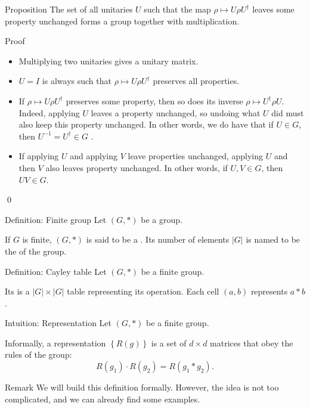 \documentclass[a4paper]{article}
\begin{document}
\begin{parag}{Proposition}
    The set of all unitaries $U$ such that the map $\rho \mapsto U \rho U^{\dagger}$ leaves some property unchanged forms a group together with multiplication.

    \begin{subparag}{Proof}
        \begin{itemize}[left=0pt]
            \item Multiplying two unitaries gives a unitary matrix.
            \item $U = I$ is always such that $\rho \mapsto U \rho U^{\dagger}$ preserves all properties.
            \item If $\rho \mapsto U \rho U^{\dagger}$ preserves some property, then so does its inverse $\rho \mapsto U^{\dagger} \rho U$. Indeed, applying $U$ leaves a property unchanged, so undoing what $U$ did must also keep this property unchanged. In other words, we do have that if $U \in G$, then $U^{-1} = U^{\dagger} \in G$  .
            \item If applying $U$ and applying $V$ leave properties unchanged, applying $U$ and then $V$ also leaves property unchanged. In other words, if $U, V \in G$, then $UV \in G$.
        \end{itemize}

        \qed
    \end{subparag}
\end{parag}

\begin{parag}{Definition: Finite group}
    Let $\left(G, *\right)$ be a group.

    If $G$ is finite, $\left(G, *\right)$ is said to be a . Its number of elements $\left|G\right|$ is named to be the  of the group.
\end{parag}

\begin{parag}{Definition: Cayley table}
    Let $\left(G, *\right)$ be a finite group.

    Its  is a $\left|G\right| \times \left|G\right|$ table representing its operation. Each cell $\left(a, b\right)$ represents $a * b$.
\end{parag}

\begin{parag}{Intuition: Representation}
    Let $\left(G, *\right)$ be a finite group.

    Informally, a representation $\left\{R\left(g\right)\right\}$ is a set of $d\times d$ matrices that obey the rules of the group: 
    \[R\left(g_1\right)\cdot R\left(g_2\right) = R\left(g_1 * g_2\right).\]

    \begin{subparag}{Remark}
        We will build this definition formally. However, the idea is not too complicated, and we can already find some examples.
    \end{subparag}
\end{parag}
\end{document}
